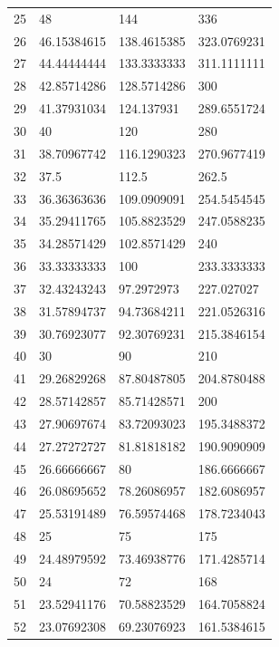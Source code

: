 \documentclass[a4paper]{tufte-handout}
\begin{document}
\begin{table}[!h]
\begin{tabular}{llll}
            25 & 48 & 144 & 336 \\
            26 & 46.15384615 & 138.4615385 & 323.0769231 \\
            27 & 44.44444444 & 133.3333333 & 311.1111111 \\
            28 & 42.85714286 & 128.5714286 & 300 \\
            29 & 41.37931034 & 124.137931 & 289.6551724 \\
            30 & 40 & 120 & 280 \\
            31 & 38.70967742 & 116.1290323 & 270.9677419 \\
            32 & 37.5 & 112.5 & 262.5 \\
            33 & 36.36363636 & 109.0909091 & 254.5454545 \\
            34 & 35.29411765 & 105.8823529 & 247.0588235 \\
            35 & 34.28571429 & 102.8571429 & 240 \\
            36 & 33.33333333 & 100 & 233.3333333 \\
            37 & 32.43243243 & 97.2972973 & 227.027027 \\
            38 & 31.57894737 & 94.73684211 & 221.0526316 \\
            39 & 30.76923077 & 92.30769231 & 215.3846154 \\
            40 & 30 & 90 & 210 \\
            41 & 29.26829268 & 87.80487805 & 204.8780488 \\
            42 & 28.57142857 & 85.71428571 & 200 \\
            43 & 27.90697674 & 83.72093023 & 195.3488372 \\
            44 & 27.27272727 & 81.81818182 & 190.9090909 \\
            45 & 26.66666667 & 80 & 186.6666667 \\
            46 & 26.08695652 & 78.26086957 & 182.6086957 \\
            47 & 25.53191489 & 76.59574468 & 178.7234043 \\
            48 & 25 & 75 & 175 \\
            49 & 24.48979592 & 73.46938776 & 171.4285714 \\
            50 & 24 & 72 & 168 \\
            51 & 23.52941176 & 70.58823529 & 164.7058824 \\
            52 & 23.07692308 & 69.23076923 & 161.5384615 \\

\end{tabular}
\end{table}
\end{document}
